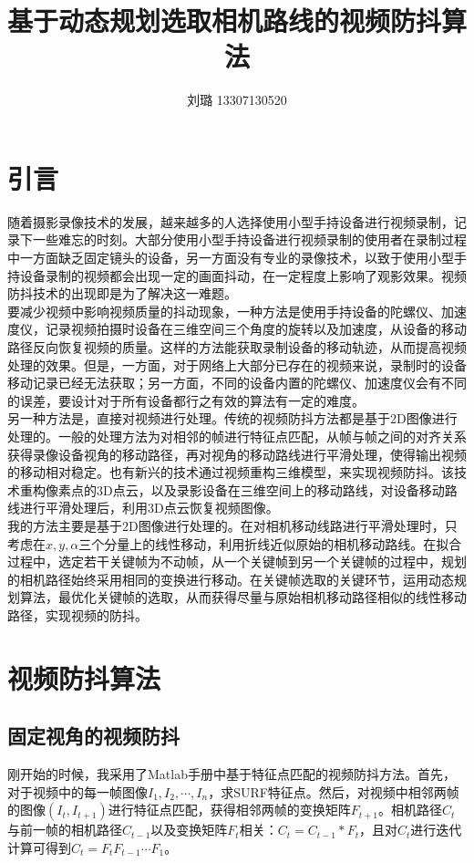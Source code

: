 \documentclass[journal, a4paper]{IEEEtran}
\begin{document}
    \title{基于动态规划选取相机路线的视频防抖算法}
    \author{刘璐 13307130520}
    \maketitle

\section{引言}
    随着摄影录像技术的发展，越来越多的人选择使用小型手持设备进行视频录制，记录下一些难忘的时刻。大部分使用小型手持设备进行视频录制的使用者在录制过程中一方面缺乏固定镜头的设备，另一方面没有专业的录像技术，以致于使用小型手持设备录制的视频都会出现一定的画面抖动，在一定程度上影响了观影效果。视频防抖技术的出现即是为了解决这一难题。 \\
    
    要减少视频中影响视频质量的抖动现象，一种方法是使用手持设备的陀螺仪、加速度仪，记录视频拍摄时设备在三维空间三个角度的旋转以及加速度，从设备的移动路径反向恢复视频的质量。这样的方法能获取录制设备的移动轨迹，从而提高视频处理的效果\cite{GYR1}\cite{GYR2}。但是，一方面，对于网络上大部分已存在的视频来说，录制时的设备移动记录已经无法获取；另一方面，不同的设备内置的陀螺仪、加速度仪会有不同的误差，要设计对于所有设备都行之有效的算法有一定的难度。\\
    
    另一种方法是，直接对视频进行处理。传统的视频防抖方法都是基于2D图像进行处理的。一般的处理方法为对相邻的帧进行特征点匹配，从帧与帧之间的对齐关系获得录像设备视角的移动路径，再对视角的移动路线进行平滑处理，使得输出视频的移动相对稳定\cite{L1Opt}。也有新兴的技术通过视频重构三维模型，来实现视频防抖。该技术重构像素点的3D点云，以及录影设备在三维空间上的移动路线，对设备移动路线进行平滑处理后，利用3D点云恢复视频图像\cite{FLiu1}\cite{FLiu2}。 \\
    
    我的方法主要是基于2D图像进行处理的。在对相机移动线路进行平滑处理时，只考虑在$x,y,\alpha$三个分量上的线性移动，利用折线近似原始的相机移动路线。在拟合过程中，选定若干关键帧为不动帧，从一个关键帧到另一个关键帧的过程中，规划的相机路径始终采用相同的变换进行移动。在关键帧选取的关键环节，运用动态规划算法，最优化关键帧的选取，从而获得尽量与原始相机移动路径相似的线性移动路径，实现视频的防抖。

\section{视频防抖算法}
\subsection{固定视角的视频防抖}
    刚开始的时候，我采用了Matlab手册中基于特征点匹配的视频防抖方法\cite{Matlab}。首先，对于视频中的每一帧图像$I_{1}, I_{2}, \cdots, I_{n}$，求SURF特征点。然后，对视频中相邻两帧的图像$(I_{t}, I_{t+1})$进行特征点匹配，获得相邻两帧的变换矩阵$F_{t+1}$。相机路径$C_{t}$与前一帧的相机路径$C_{t-1}$以及变换矩阵$F_{t}$相关：$C_{t}=C_{t-1}*F_{t}$，且对$C_{t}$进行迭代计算可得到$C_{t}=F_{t}F_{t-1}\cdots F_{1}$。 \\
    
\end{document}
